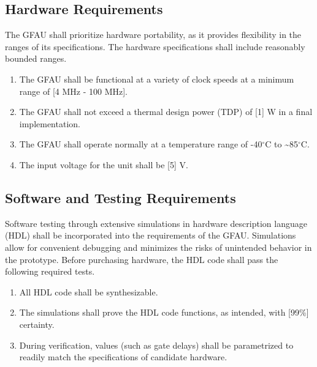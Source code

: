 \documentclass[12pt]{extarticle}
\begin{document}
        \subsection{Hardware Requirements} The GFAU shall prioritize hardware
        portability, as it provides flexibility in the ranges of its
        specifications. The hardware specifications shall include reasonably
        bounded ranges.

        \begin{enumerate}

            \item The GFAU shall be functional at a variety of clock speeds at
            a minimum range of [4 MHz - 100 MHz].

            \item The GFAU shall not exceed a thermal design power (TDP) of [1]
            W in a final implementation.

            \item The GFAU shall operate normally at a temperature range of
            -40$^{\circ}$C to \textasciitilde 85$^{\circ}$C.

            \item The input voltage for the unit shall be [5] V.

        \end{enumerate}

        \subsection{Software and Testing Requirements} Software testing through
        extensive simulations in hardware description language (HDL) shall be
        incorporated into the requirements of the GFAU. Simulations allow for
        convenient debugging and minimizes the risks of unintended behavior in
        the prototype. Before purchasing hardware, the HDL code shall pass the
        following required tests.

        \begin{enumerate}

            \item All HDL code shall be synthesizable.

            \item The simulations shall prove the HDL code functions, as
            intended, with [99\%] certainty.

            \item During verification, values (such as gate delays) shall be
            parametrized to readily match the specifications of candidate
            hardware.

        \end{enumerate}
\end{document}
